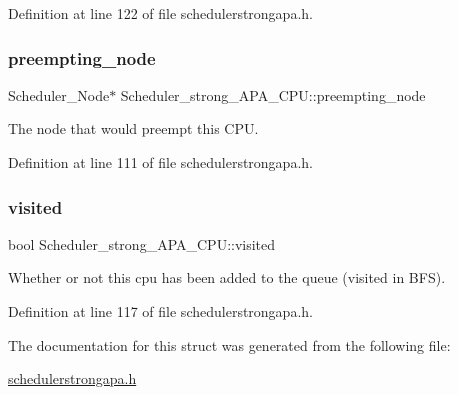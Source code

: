 Definition at line 122 of file schedulerstrongapa.\+h.

\mbox{\label{structScheduler__strong__APA__CPU_a0fbe6687ca055b673515e2e3b1f023ac}} 
\subsubsection{\texorpdfstring{preempting\+\_\+node}{preempting\_node}}
{\footnotesize\ttfamily Scheduler\+\_\+\+Node$\ast$ Scheduler\+\_\+strong\+\_\+\+A\+P\+A\+\_\+\+C\+P\+U\+::preempting\+\_\+node}



The node that would preempt this C\+PU. 



Definition at line 111 of file schedulerstrongapa.\+h.

\mbox{\label{structScheduler__strong__APA__CPU_a02c57f2d305f2b6e2a63a38842bb0b6c}} 
\subsubsection{\texorpdfstring{visited}{visited}}
{\footnotesize\ttfamily bool Scheduler\+\_\+strong\+\_\+\+A\+P\+A\+\_\+\+C\+P\+U\+::visited}



Whether or not this cpu has been added to the queue (visited in B\+FS). 



Definition at line 117 of file schedulerstrongapa.\+h.



The documentation for this struct was generated from the following file\+:\begin{DoxyCompactItemize}
\item 
\hyperlink{schedulerstrongapa_8h}{schedulerstrongapa.\+h}\end{DoxyCompactItemize}
